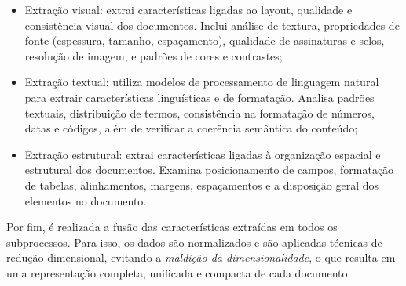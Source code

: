 \begin{itemize}
    \item Extração visual: extrai características ligadas ao layout, qualidade e consistência visual dos documentos. Inclui análise de textura, propriedades de fonte (espessura, tamanho, espaçamento), qualidade de assinaturas e selos, resolução de imagem, e padrões de cores e contrastes;
    \item Extração textual: utiliza modelos de processamento de linguagem natural para extrair características linguísticas e de formatação. Analisa padrões textuais, distribuição de termos, consistência na formatação de números, datas e códigos, além de verificar a coerência semântica do conteúdo;
    \item Extração estrutural: extrai características ligadas à organização espacial e estrutural dos documentos. Examina posicionamento de campos, formatação de tabelas, alinhamentos, margens, espaçamentos e a disposição geral dos elementos no documento.
\end{itemize}

Por fim, é realizada a fusão das características extraídas em todos os subprocessos. Para isso, os dados são normalizados e são aplicadas técnicas de redução dimensional, evitando a \textit{maldição da dimensionalidade}, o que resulta em uma representação completa, unificada e compacta de cada documento.